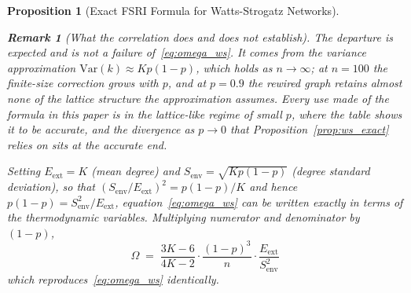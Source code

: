 \documentclass[11pt,a4paper]{article}
\newtheorem{proposition}{Proposition}
\newtheorem{remark}{Remark}
\begin{document}
\begin{proposition}[Exact FSRI Formula for Watts-Strogatz Networks]
\begin{remark}[What the correlation does and does not establish]
The departure is expected and is not a failure of~\eqref{eq:omega_ws}. It
comes from the variance approximation $\mathrm{Var}(k) \approx Kp(1-p)$,
which holds as $n \to \infty$; at $n = 100$ the finite-size correction grows
with $p$, and at $p = 0.9$ the rewired graph retains almost none of the
lattice structure the approximation assumes. Every use made of the formula
in this paper is in the lattice-like regime of small $p$, where the table
shows it to be accurate, and the divergence as $p \to 0$ that
Proposition~\ref{prop:ws_exact} relies on sits at the accurate end.
\end{remark}

Setting $E_\mathrm{ext} = K$ (mean degree) and
$S_\mathrm{env} = \sqrt{Kp(1-p)}$ (degree standard deviation), so that
$(S_\mathrm{env}/E_\mathrm{ext})^2 = p(1-p)/K$ and hence
$p(1-p) = S_\mathrm{env}^2/E_\mathrm{ext}$, equation~\eqref{eq:omega_ws} can be
written exactly in terms of the thermodynamic variables. Multiplying
numerator and denominator by $(1-p)$,
\begin{equation}
\boxed{\;\Omega \;=\; \frac{3K-6}{4K-2} \cdot \frac{(1-p)^3}{n}
\cdot \frac{E_\mathrm{ext}}{S_\mathrm{env}^2}\;}
\label{eq:exact_relation}
\end{equation}
which reproduces~\eqref{eq:omega_ws} identically.


\end{proposition}
\end{document}
